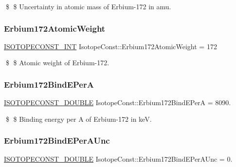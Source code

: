 \$ \$ Uncertainty in atomic mass of Erbium-\/172 in amu. \mbox{\label{group___isotope_const-_erbium-_er172_ga103e0617b926bcef9b47385338011970}} 
\subsubsection{\texorpdfstring{Erbium172\+Atomic\+Weight}{Erbium172AtomicWeight}}
{\footnotesize\ttfamily \mbox{\hyperlink{group___isotope_const-_macros_ga5f18360b3e99483a35c32d789e62621c}{I\+S\+O\+T\+O\+P\+E\+C\+O\+N\+S\+T\+\_\+\+I\+NT}} Isotope\+Const\+::\+Erbium172\+Atomic\+Weight = 172}

\$ \$ Atomic weight of Erbium-\/172. \mbox{\label{group___isotope_const-_erbium-_er172_ga94f502c819321a9e47cc877585245007}} 
\subsubsection{\texorpdfstring{Erbium172\+Bind\+E\+PerA}{Erbium172BindEPerA}}
{\footnotesize\ttfamily \mbox{\hyperlink{group___isotope_const-_macros_ga8f45a7272ce02c0b4c65c44636ed719a}{I\+S\+O\+T\+O\+P\+E\+C\+O\+N\+S\+T\+\_\+\+D\+O\+U\+B\+LE}} Isotope\+Const\+::\+Erbium172\+Bind\+E\+PerA = 8090.}

\$ \$ Binding energy per A of Erbium-\/172 in keV. \mbox{\label{group___isotope_const-_erbium-_er172_gacdd0ddf70ed9783c8dca40c9b6b05134}} 
\subsubsection{\texorpdfstring{Erbium172\+Bind\+E\+Per\+A\+Unc}{Erbium172BindEPerAUnc}}
{\footnotesize\ttfamily \mbox{\hyperlink{group___isotope_const-_macros_ga8f45a7272ce02c0b4c65c44636ed719a}{I\+S\+O\+T\+O\+P\+E\+C\+O\+N\+S\+T\+\_\+\+D\+O\+U\+B\+LE}} Isotope\+Const\+::\+Erbium172\+Bind\+E\+Per\+A\+Unc = 0.}

